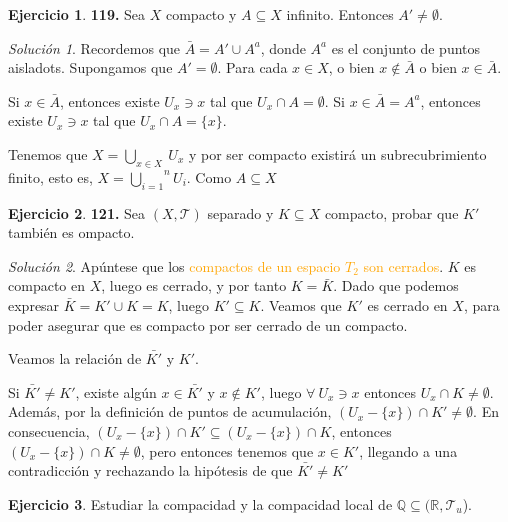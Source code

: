 \documentclass[12pt,twoside]{report}
\newcommand\mc[1]{\mathcal{#1}}
\theoremstyle{azul}
\theoremstyle{azul2}
\theoremstyle{plain}
\theoremstyle{definition}
\newtheorem*{ejer}{Ejercicio}
\theoremstyle{remark}
\newtheorem*{sol}{Solución}
\begin{document}
\begin{ejer}
    \textbf{119.} Sea $X$ compacto y $A \subseteq X$ infinito. Entonces $A'\neq \emptyset$. 
\end{ejer}
\begin{sol}
Recordemos que $\bar{A}=A'\cup A^a$, donde $A^a$ es el conjunto de puntos aisladots. Supongamos que $A'=\emptyset$. Para cada $x \in X$, o bien $x \nin \bar{A}$ o bien $x \in \bar{A}$.

Si $x\in \bar{A}$, entonces existe $U_x\ni x$ tal que $U_x\cap A=\emptyset$. Si $x\in \bar{A}=A^a$, entonces existe $U_x\ni x$ tal que $U_x\cap A=\{x\}$.

Tenemos que $X=\underset{x\in X}{\bigcup}\:U_x$ y por ser compacto existirá un subrecubrimiento finito, esto es, $X=\overset{n}{\underset{i=1}{\bigcup}} U_i$. Como $A\subseteq X$

\end{sol}
\begin{ejer} \textbf{121.}
    Sea $(X, \mc{T})$ separado y $K \subseteq X$ compacto, probar que $K'$ también es ompacto. 
\end{ejer}
\begin{sol}
  Apúntese que los \textcolor{orange}{compactos de un espacio $T_2$ son cerrados}. $K$ es compacto en $X$, luego es cerrado, y por tanto $K=\bar{K}$. Dado que podemos expresar $\bar{K}=K'\cup K=K$, luego $K' \subseteq K$. Veamos que $K'$ es cerrado en $X$, para poder asegurar que es compacto por ser cerrado de un compacto.   

  Veamos la relación de $\bar{K'}$ y $K'$.

  Si $\bar{K'} \neq K'$, existe algún $x\in \bar{K'}$ y $x \nin K'$, luego $\forall \: U_x \ni x$ entonces $U_x \cap K \neq \emptyset$. Además, por la definición de puntos de acumulación, $(U_x-\{x\})\cap K' \neq \emptyset$. En consecuencia, $(U_x-\{x\})\cap K' \subseteq (U_x-\{x\})\cap K$, entonces $(U_x-\{x\})\cap K \neq \emptyset$, pero entonces tenemos que $x \in K'$, llegando a una contradicción y rechazando la hipótesis de que $\bar{K'} \neq K'$ 
\end{sol}
\begin{ejer}
Estudiar la compacidad y la compacidad local de $\mathbb{Q}\subseteq (\mathbb{R},\mc{T}_u$).
\end{ejer}
\end{document}
